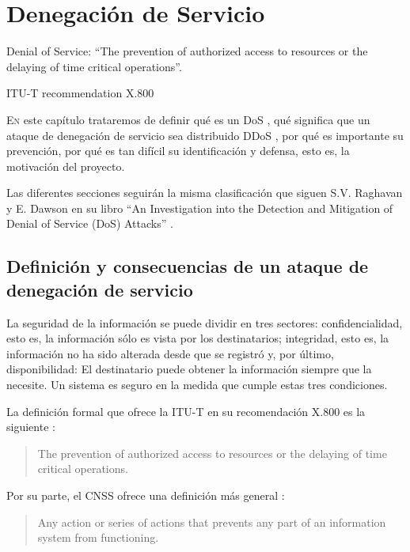 \chapter{Denegación de Servicio}
\pagestyle{esitscCD}
\epigraph{ Denial of Service: ``The prevention of authorized access to resources or the delaying of time critical 
operations''. }{ITU-T recommendation X.800}

\lettrine[lraise=-0.1, lines=2, loversize=0.25]{E}n este capítulo trataremos de definir qué es un \gls{DoS} 
, qué significa que un ataque de denegación de servicio sea distribuido \acrshort{DDoS} , por 
qué es importante su prevención, por qué es tan difícil su identificación y defensa, esto es, la motivación del 
proyecto.

Las diferentes secciones seguirán la misma clasificación que siguen S.V. Raghavan y E. Dawson en su libro ``An 
Investigation into the Detection and Mitigation of Denial of Service (DoS) Attacks'' \cite{Raghavan}.

\section{Definición y consecuencias de un ataque de denegación de servicio} \label{sec:Tipos de ataques DoS}
La seguridad de la información se puede dividir en tres sectores: confidencialidad, esto es, la 
información sólo es vista por los destinatarios; integridad, esto es, la información no ha sido 
alterada desde que se registró y, por último, disponibilidad: El destinatario puede obtener la 
información siempre que la necesite. Un sistema es seguro en la medida que cumple estas tres 
condiciones.

La definición formal que ofrece la \gls{ITU-T} en su recomendación X.800 es la siguiente \cite{ITU-T_DDoS_def}:

\begin{quote}
 The prevention of authorized access to resources or the delaying of time critical operations.
\end{quote}

Por su parte, el \gls{CNSS} ofrece una definición más general \cite{CCNS_DDoS_def}:

\begin{quote}
 Any action or series of actions that prevents any part of an information system from functioning.
\end{quote}

